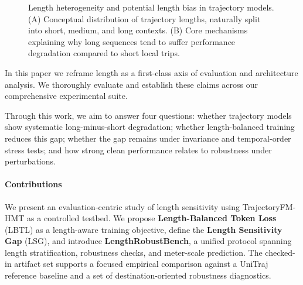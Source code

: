 \documentclass{article}
\begin{document}
\begin{figure}[t]
{
}
\vspace{0.5em}
\caption{Length heterogeneity and potential length bias in trajectory models. (A) Conceptual distribution of trajectory lengths, naturally split into short, medium, and long contexts. (B) Core mechanisms explaining why long sequences tend to suffer performance degradation compared to short local trips.}
\label{fig:intro_length_bias}
\end{figure}

In this paper we reframe length as a first-class axis of evaluation and architecture analysis. We thoroughly evaluate and establish these claims across our comprehensive experimental suite.

Through this work, we aim to answer four questions: whether trajectory models show systematic long-minus-short degradation; whether length-balanced training reduces this gap; whether the gap remains under invariance and temporal-order stress tests; and how strong clean performance relates to robustness under perturbations.
\newpage
\paragraph{Contributions}
We present an evaluation-centric study of length sensitivity using TrajectoryFM-HMT as a controlled testbed. We propose \textbf{Length-Balanced Token Loss} (LBTL) as a length-aware training objective, define the \textbf{Length Sensitivity Gap} (LSG), and introduce \textbf{LengthRobustBench}, a unified protocol spanning length stratification, robustness checks, and meter-scale prediction. The checked-in artifact set supports a focused empirical comparison against a UniTraj reference baseline and a set of destination-oriented robustness diagnostics.
\end{document}
